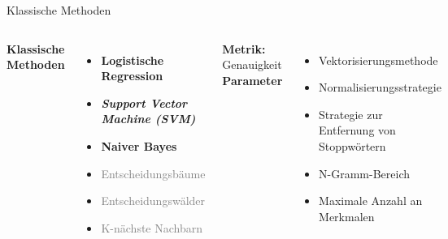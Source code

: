 \documentclass[aspectratio=169]{beamer} %
\begin{document}
\begin{frame}{Klassische Methoden}
  \fontsize{10pt}{12pt}\selectfont
  \vspace{0.3cm}

  \begin{columns}[t]
      \textbf{Klassische Methoden}
      \vspace{0.3cm}
      \begin{itemize}
          \item \textbf{Logistische Regression}
          \item \textbf{\textit{Support Vector Machine (SVM)}}
          \item \textbf{Naiver Bayes}
          \item \textcolor{gray}{Entscheidungsbäume}
          \item \textcolor{gray}{Entscheidungswälder}
          \item \textcolor{gray}{K-nächste Nachbarn}
      \end{itemize}
      \vspace{0.5cm}
  \textbf{Metrik:} Genauigkeit
    \vspace{-0.5cm}
      \textbf{Parameter}
      \vspace{0.3cm}
      \begin{itemize}
    \item Vektorisierungsmethode
    \item Normalisierungsstrategie
    \item Strategie zur Entfernung von Stoppwörtern
    \item N-Gramm-Bereich
    \item Maximale Anzahl an Merkmalen
\end{itemize}
  \end{columns}
\end{frame}
\end{document}
